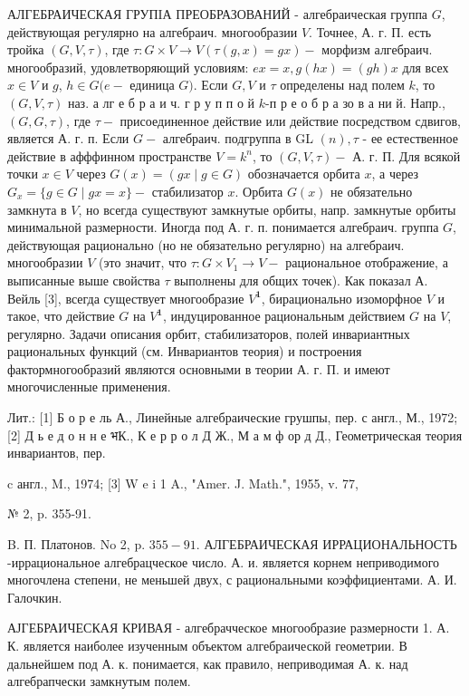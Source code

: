 \documentclass[10pt]{article}
\begin{document}
АЛГЕБРАИЧЕСКАЯ ГРУПIА ПРЕОБРАЗОВАНИЙ - алгебраическая группа $G$, действующая регулярно на алгебраич. многообразии $V$. Точнее, А. г. П. есть тройка $(G, V, \tau)$, где $\tau: G \times V \rightarrow V(\tau(g, x)=g x)-$ морфизм алгебраич. многообразий, удовлетворяющий условиям: $e x=x, g(h x)=(g h) x$ для всех $x \in V$ и $g$, $h \in G(e-$ единица $G)$. Если $G, V$ и $\tau$ определены над полем $k$, то $(G, V, \tau)$ наз. а лг е б р а и ч. г р у п п о й $k$-п р е о б р а зо в а ни й. Напр., $(G, G, \tau)$, где $\tau-$ присоединенное действие или действие посредством сдвигов, является А. г. п. Если $G-$ алгебраич. подгруппа в GL $(n), \tau$ - ее естественное действие в афффинном пространстве $V=k^{n}$, то $(G, V, \tau)-$ А. г. П. Для всякой точки $x \in V$ через $G(x)=(g x \mid g \in G)$ обозначается орбита $x$, а через $G_{x}=\{g \in G \mid g x=x\}-$ стабилизатор $x$. Орбита $G(x)$ не обязательно замкнута в $V$, но всегда существуют замкнутые орбиты, напр. замкнутые орбиты минимальной размерности. Иногда под А. г. п. понимается алгебраич. группа $G$, действующая рационально (но не обязательно регулярно) на алгебраич. многообразии $V$ (это значит, что $\tau: G \times V_{1} \rightarrow V-$ рациональное отображение, а выписанные выше свойства $\tau$ выполнены для общих точек). Как показал А. Вейль [3], всегда существует многообразие $V^{\mathbf{1}}$, бирационально изоморфное $V$ и такое, что действие $G$ на $V^{\mathbf{1}}$, индуцированное рациональным действием $G$ на $V$, регулярно. Задачи описания орбит, стабилизаторов, полей инвариантных рациональных функций (см. Инвариантов теория) и построения фактормногообразий являются основными в теории А. г. П. и имеют многочисленные применения.



Лит.: [1] Б о р е ль А., Линейные алгебраические грушпы, пер. с англ., М., 1972; [2] Д ь е д о н н е भК., К е р р о л Д Ж., М а м ф ор д Д., Геометрическая теория инвариантов, пер.



c англ., M., 1974; [3] W e i 1 A., "Amer. J. Math.", 1955, v. 77,

№ 2, p. 355-91.

B. П. Платонов. No 2, p. $355-91$. АЛГЕБРАИЧЕСКАЯ ИРРАЦИОНАЛЬНОСТЬ -иррациональное алгебрацческое число. А. и. является корнем неприводимого многочлена степени, не меньшей двух, с рациональными коэффициентами. А. И. Галочкин.



АЈГЕБРАИЧЕСКАЯ КРИВАЯ - алгебрачческое многообразие размерности 1. А. К. является наиболее изученным объектом алгебраической геометрии. В дальнейшем под А. к. понимается, как правило, неприводимая А. к. над алгебрапчески замкнутым полем.
\end{document}
